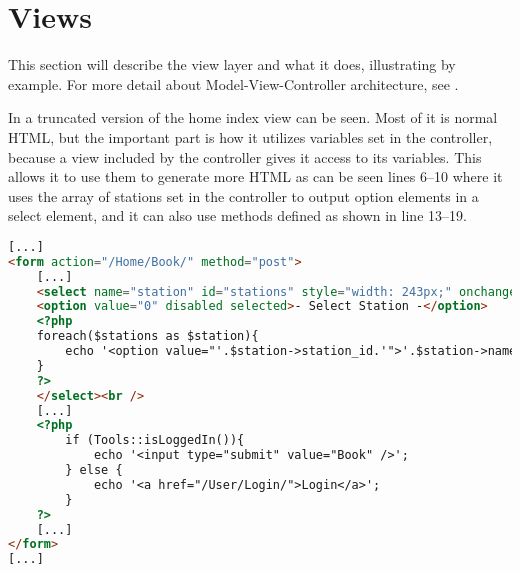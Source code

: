 \section{Views}
This section will describe the view layer and what it does, illustrating by example. For more detail about Model-View-Controller architecture, see .

In  a truncated version of the home index view can be seen. Most of it is normal HTML, but the important part is how it utilizes variables set in the controller, because a view included by the controller gives it access to its variables. This allows it to use them to generate more HTML as can be seen lines 6--10 where it uses the array of stations set in the controller to output option elements in a select element, and it can also use methods defined as shown in line 13--19.

\begin{lstlisting}[language=html, label=lst:homeIndexView, caption={Home Index View}]
[...]
<form action="/Home/Book/" method="post">
    [...]
    <select name="station" id="stations" style="width: 243px;" onchange="UpdateMarker()">
    <option value="0" disabled selected>- Select Station -</option>
    <?php
    foreach($stations as $station){
        echo '<option value="'.$station->station_id.'">'.$station->name.'</option>';
    }
    ?>
    </select><br />
    [...]
    <?php
        if (Tools::isLoggedIn()){
            echo '<input type="submit" value="Book" />';
        } else {
            echo '<a href="/User/Login/">Login</a>';
        }
    ?>
    [...]
</form>
[...]
\end{lstlisting}
